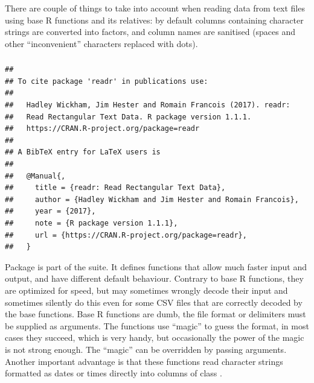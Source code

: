 \documentclass[krantz2]{krantz}\usepackage{knitr}%
\begin{document}
\begin{warningbox}
There are couple of things to take into account when reading data from text files using base R functions  and its relatives: by default columns containing character strings are converted into factors, and column names are sanitised (spaces and other ``inconvenient'' characters replaced with dots).
\end{warningbox}

\subsubsection[readr]{}\label{sec:files:readr}

\begin{knitrout}\footnotesize
{}\color{fgcolor}\begin{kframe}
\begin{alltt}
\hlstd{(} \hlstd{=} \hlstd{)}
\end{alltt}
\begin{verbatim}
## 
## To cite package 'readr' in publications use:
## 
##   Hadley Wickham, Jim Hester and Romain Francois (2017). readr:
##   Read Rectangular Text Data. R package version 1.1.1.
##   https://CRAN.R-project.org/package=readr
## 
## A BibTeX entry for LaTeX users is
## 
##   @Manual{,
##     title = {readr: Read Rectangular Text Data},
##     author = {Hadley Wickham and Jim Hester and Romain Francois},
##     year = {2017},
##     note = {R package version 1.1.1},
##     url = {https://CRAN.R-project.org/package=readr},
##   }
\end{verbatim}
\end{kframe}
\end{knitrout}

Package  is part of the  suite. It defines functions that allow much faster input and output, and have different default behaviour. Contrary to base R functions, they are optimized for speed, but may sometimes wrongly decode their input and sometimes silently do this even for some CSV files that are correctly decoded by the base functions. Base R functions are dumb, the file format or delimiters must be supplied as arguments. The  functions use ``magic'' to guess the format, in most cases they succeed, which is very handy, but occasionally the power of the magic is not strong enough. The ``magic'' can be overridden by passing arguments. Another important advantage is that these functions read character strings formatted as dates or times directly into columns of class .
\end{document}
